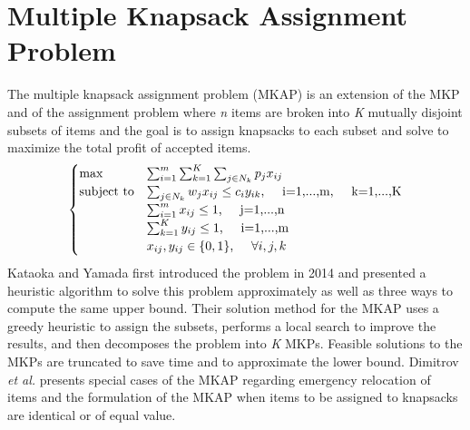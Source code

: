 \section{Multiple Knapsack Assignment Problem}
The multiple knapsack assignment problem (MKAP) is an extension of the MKP and of the assignment problem where \textit{n} items are broken into \textit{K} mutually disjoint subsets of items and the goal is to assign knapsacks to each subset and solve to maximize the total profit of accepted items. 
\begin{align}
\begin{cases}
\max 				&\sum_{i=1}^m \sum_{k=1}^K\sum_{j\in N_k} p_jx_{ij} \\
\text{subject to}   &\sum_{j\in N_k} w_jx_{ij}\leq c_iy_{ik} \text{,}	 \hspace{5mm}\text{i=1,...,m}\text{,}	 \hspace{5mm}\text{k=1,...,K}\\
					&\sum_{i=1}^m x_{ij}\leq 1 		\text{,} 	 \hspace{5mm}\text{j=1,...,n}\\
                    &\sum_{k=1}^K y_{ij}\leq 1 	\text{,} 	 \hspace{5mm}\text{i=1,...,m}\\
					&x_{ij},y_{ij} \in \{0,1\} 	\text{,}	 \hspace{5mm}\forall i,j,k
\end{cases}
\end{align}
%
Kataoka and Yamada \cite{Kataoka2014} first introduced the problem in 2014 and presented a heuristic algorithm to solve this problem approximately as well as three ways to compute the same upper bound.  Their solution method for the MKAP uses a greedy heuristic to assign the subsets, performs a local search to improve the results, and then decomposes the problem into \textit{K} MKPs. Feasible solutions to the MKPs are truncated to save time and to approximate the lower bound. Dimitrov \textit{et al.} \cite{Dimitrov2017EmergencyProblem} presents special cases of the MKAP regarding emergency relocation of items and the formulation of the MKAP when items to be assigned to knapsacks are identical or of equal value. 

